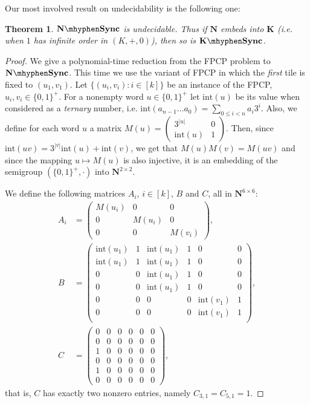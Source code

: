\documentclass[submission,copyright,creativecommons]{eptcs}
\def\bK{{\mathbf{K}}}
\def\bN{{\mathbf{N}}}
\theoremstyle{plain}
\newtheorem{theorem}{Theorem}
\theoremstyle{definition}
\theoremstyle{remark}
\begin{document}
Our most involved result on undecidability is the following one:
\begin{theorem}
\label{thm-n-sync}
$\bN\mhyphen\mathbf{Sync}$ is undecidable.
Thus if $\bN$ embeds into $\bK$ (i.e. when $1$ has infinite order in $(K,+,0)$), then so is $\bK\mhyphen\mathbf{Sync}$.
\end{theorem}
\begin{proof}
We give a polynomial-time reduction from the FPCP problem to $\bN\mhyphen\mathbf{Sync}$.
This time we use the variant of FPCP in which the \emph{first} tile is fixed to $(u_1,v_1)$.
Let $\{(u_i,v_i):i\in[k]\}$ be an instance of the FPCP, $u_i,v_i\in\{0,1\}^+$.
For a nonempty word $u\in\{0,1\}^+$ let $\textrm{int}(u)$ be its value when considered as a \emph{ternary} number, i.e.
$\textrm{int}(a_{n-1}\ldots a_0)=\sum_{0\leq i<n}a_i3^i$.
Also, we define for each word $u$ a matrix $M(u)=\left(\begin{array}{ll}3^{|u|}&0\\\textrm{int}(u)&1\end{array}\right)$.
Then, since $\textrm{int}(uv)=3^{|v|}\textrm{int}(u)+\textrm{int}(v)$, we get that $M(u)M(v)=M(uv)$ and since the mapping $u\mapsto M(u)$
is also injective, it is an embedding of the semigroup $(\{0,1\}^+,\cdot)$ into $\bN^{2\times 2}$.

We define the following matrices $A_i$, $i\in[k]$, $B$ and $C$, all in $\bN^{6\times 6}$:
\begin{align*}
A_i &=\left(\begin{array}{lll}M(u_i)&0&0\\0&M(u_i)&0\\0&0&M(v_i)\end{array}\right),\\
B &=
\left(\begin{array}{llllll}
\mathrm{int}(u_1)&1&\mathrm{int}(u_1)&1&0&0\\
\mathrm{int}(u_1)&1&\mathrm{int}(u_1)&1&0&0\\
0&0&\mathrm{int}(u_1)&1&0&0\\
0&0&\mathrm{int}(u_1)&1&0&0\\
0&0&0&0&\mathrm{int}(v_1)&1\\
0&0&0&0&\mathrm{int}(v_1)&1\\
\end{array}\right),\\
C &= \left(\begin{array}{llllll}0&0&0&0&0&0\\0&0&0&0&0&0\\1&0&0&0&0&0\\0&0&0&0&0&0\\1&0&0&0&0&0\\0&0&0&0&0&0\end{array}\right),
\end{align*}
that is, $C$ has exactly two nonzero entries, namely $C_{3,1}=C_{5,1}=1$.


\end{proof}
\end{document}
